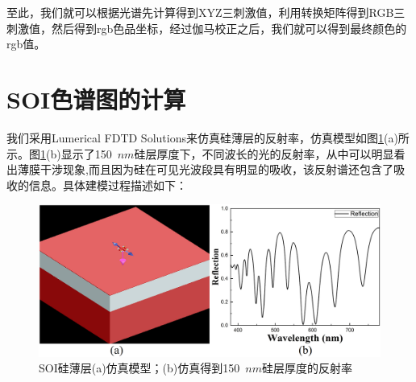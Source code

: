 至此，我们就可以根据光谱先计算得到XYZ三刺激值，利用转换矩阵得到RGB三刺激值，然后得到rgb色品坐标，经过伽马校正之后，我们就可以得到最终颜色的rgb值。

\section{SOI色谱图的计算}
我们采用Lumerical FDTD Solutions\cite{fdtdsolution}来仿真硅薄层的反射率，仿真模型如图\ref{color_reflection}(a)所示。图\ref{color_reflection}(b)显示了150~$nm$硅层厚度下，不同波长的光的反射率，从中可以明显看出薄膜干涉现象,而且因为硅在可见光波段具有明显的吸收，该反射谱还包含了吸收的信息。具体建模过程描述如下：

\begin{figure}[htb]
	\centering
	\includegraphics[width=14cm]{./Pictures/color_reflection.jpg}
	\captionsetup{justification=centering}
	\caption{SOI硅薄层(a)仿真模型；(b)仿真得到150~$nm$硅层厚度的反射率}
	\label{color_reflection}
\end{figure}

